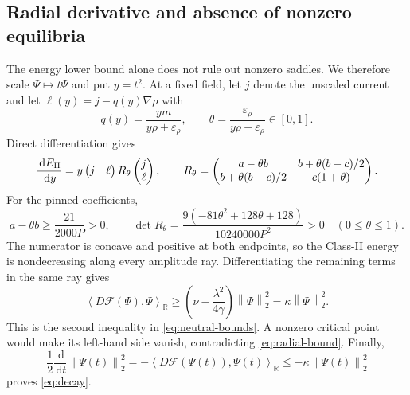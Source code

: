 \documentclass[11pt]{article}
\numberwithin{equation}{section}
\theoremstyle{definition}
\newcommand{\R}{\mathbb R}
\newcommand{\cF}{\mathcal F}
\newcommand{\dd}{\,\mathrm d}
\newcommand{\norm}[1]{\left\lVert#1\right\rVert}
\newcommand{\ip}[2]{\left\langle #1,#2\right\rangle}
\newcommand{\eps}{\varepsilon}
\begin{document}
\subsection{Radial derivative and absence of nonzero equilibria}

The energy lower bound alone does not rule out nonzero saddles.  We therefore
scale $\Psi\mapsto t\Psi$ and put $y=t^2$.  At a fixed field, let $j$ denote
the unscaled current and let $\ell(y)=j-q(y)\nabla\rho$ with
\begin{equation}
 q(y)=\frac{y m}{y\rho+\eps_\rho},\qquad
 \theta=\frac{\eps_\rho}{y\rho+\eps_\rho}\in[0,1].
 \label{eq:theta}
\end{equation}
Direct differentiation gives
\begin{equation}
 \frac{\dd E_{\rm II}}{\dd y}
 =y\begin{pmatrix}j&\ell\end{pmatrix}
 R_\theta\begin{pmatrix}j\\\ell\end{pmatrix},\qquad
 R_\theta=\begin{pmatrix}
 a-\theta b&b+\theta(b-c)/2\\
 b+\theta(b-c)/2&c(1+\theta)
 \end{pmatrix}.
 \label{eq:Rtheta}
\end{equation}
For the pinned coefficients,
\begin{equation}
 a-\theta b\ge\frac{21}{2000P}>0,\qquad
 \det R_\theta=\frac{9(-81\theta^2+128\theta+128)}{10240000P^2}>0
 \quad(0\le\theta\le1).
 \label{eq:Rtheta-positive}
\end{equation}
The numerator is concave and positive at both endpoints, so the Class-II
energy is nondecreasing along every amplitude ray.  Differentiating the
remaining terms in the same ray gives
\begin{equation}
 \ip{D\cF(\Psi)}{\Psi}_{\R}
 \ge\left(\nu-\frac{\lambda^2}{4\gamma}\right)\norm{\Psi}_2^2
 =\kappa\norm{\Psi}_2^2.
 \label{eq:radial-bound}
\end{equation}
This is the second inequality in \eqref{eq:neutral-bounds}.  A nonzero
critical point would make its left-hand side vanish, contradicting
\eqref{eq:radial-bound}.  Finally,
\begin{equation}
 \frac12\frac{\dd}{\dd t}\norm{\Psi(t)}_2^2
 =-\ip{D\cF(\Psi(t))}{\Psi(t)}_{\R}
 \le-\kappa\norm{\Psi(t)}_2^2
 \label{eq:decay-diff}
\end{equation}
proves \eqref{eq:decay}.
\end{document}
